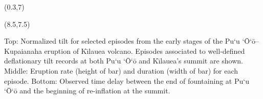 \documentclass[a0,portrait]{a0poster}
\def\LHead#1{\noindent{\LARGE\color{DarkBlue} #1}\smallskip}
\begin{document}
\begin{textblock}{8}(0.3,7)
\end{textblock}

\begin{textblock}{6}(8.5,7.5)
  \begin{center}
    Top: Normalized tilt for selected episodes from the early stages
    of the Pu`u `\=O`\=o–Kupaianaha eruption of K\={\i}lauea
    volcano. Episodes associated to well-defined deflationary tilt
    records at both Pu`u `\=O`\=o and K\={\i}lauea's summit are shown. Middle: Eruption rate (height of bar) and duration (width of bar) for each episode. Bottom: Observed time delay between the end of fountaining at Pu`u `\=O`\=o and the beginning of re-inflation at the summit.
  \end{center}
\end{textblock}



\end{document}

